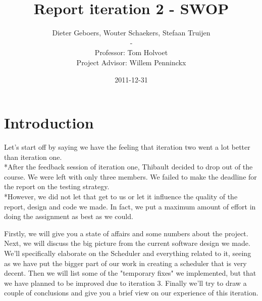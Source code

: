 \documentclass[11pt]{article}
\title{Report iteration 2 - SWOP}
\author{Dieter Geboers, Wouter Schaekers, Stefaan Truijen\\ - \\ Professor: Tom Holvoet \\ Project Advisor: Willem Penninckx}
\date{2011-12-31}
\begin{document}
\maketitle

\section{Introduction}
Let's start off by saying we have the feeling that iteration two went a lot better than iteration one.
\\*After the feedback session of iteration one, Thibault decided to drop out of the course. We were left with only three members. We failed to make the deadline for the report on the testing strategy.
\\*However, we did not let that get to us or let it influence the quality of the report, design and code we made. In fact, we put a maximum amount of effort in doing the assignment as best as we could.\newline

Firstly, we will give you a state of affairs and some numbers about the project. Next, we will discuss the big picture from the current software design we made. We'll specifically elaborate on the Scheduler and everything related to it, seeing as we have put the bigger part of our work in creating a scheduler that is very decent. Then we will list some of the "temporary fixes" we implemented, but that we have planned to be improved due to iteration 3. Finally we'll try to draw a couple of conclusions and give you a brief view on our experience of this iteration.

\pagebreak
\tableofcontents
\pagebreak
\end{document}
